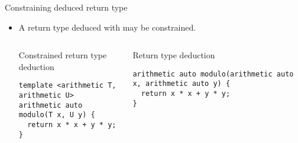 \begin{frame}[t,fragile]{Constraining deduced return type}
\begin{itemize}
  \item A return type deduced with  may be constrained.

\begin{columns}[T]

\begin{block}{Constrained return type deduction}
\begin{lstlisting}
template <arithmetic T, arithmetic U>
arithmetic auto modulo(T x, U y) {
  return x * x + y * y;
}
\end{lstlisting}
\end{block}


\begin{block}{Return type deduction}
\begin{lstlisting}
arithmetic auto modulo(arithmetic auto x, arithmetic auto y) {
  return x * x + y * y;
}
\end{lstlisting}
\end{block}

\end{columns}
\end{itemize}
\end{frame}
